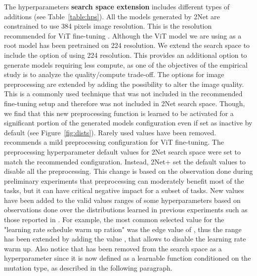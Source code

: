 \documentclass{article} \usepackage{iclr2023_conference,times}
\newcommand{\method}{2Net+\xspace}
\begin{document}
The hyperparameters \textbf{search space extension} includes different types of additions (see Table~\ref{table:hps}).
All the models generated by 2Net are constrained to use 384 pixels image resolution. This is the resolution recommended for ViT fine-tuning \citep{Steiner2021HowTT}. Although the ViT model we are using as a root model has been pretrained on 224 resolution.
We extend the search space to include the option of using 224 resolution.
This provides an additional option to generate models requiring less compute, as one of the objectives of the empirical study is to analyze the quality/compute trade-off.
The options for image preprocessing are extended by adding the possibility to alter the image quality.
This is a commonly used technique that was not included in the recommended fine-tuning setup \citep{Steiner2021HowTT} and therefore was not included in 2Net search space.
Though, we find that this new preprocessing function is learned to be activated for a significant portion of the generated models configuration even if set as inactive by default (see Figure~\ref{fig:dists}).
Rarely used values have been removed.
\cite{Steiner2021HowTT} recommends a mild preprocessing configuration for ViT fine-tuning.
The preprocessing hyperparameter default values for 2Net search space were set to match the recommended configuration.
Instead, \method set the default values to disable all the preprocessing.
This change is based on the observation done during preliminary experiments that preprocessing can moderately benefit most of the tasks, but it can have critical negative impact for a subset of tasks. New values have been added to the valid values ranges of some hyperparameters based on observations done over the distributions learned in previous experiments such as those reported in \cite{Gesmundo2022munet2}. For example, the most common selected value for the "learning rate schedule warm up ration" was the edge value of , thus the range has been extended by adding the value , that allows to disable the learning rate warm up.
Also notice that  has been removed from the search space as a hyperparameter since it is now defined as a learnable function conditioned on the mutation type, as described in the following paragraph.
\end{document}
